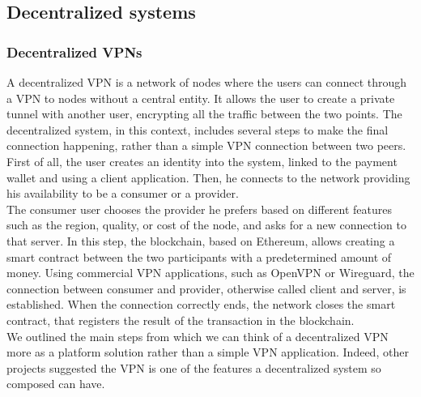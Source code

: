 \documentclass[12pt]{article}
\begin{document}
	\subsection{Decentralized systems}

	\subsubsection{Decentralized VPNs}

	A decentralized VPN is a network of nodes where the users can connect through a VPN to nodes without a central entity. It allows the user to create a private tunnel with another user, encrypting all the traffic between the two points. 
	The decentralized system, in this context, includes several steps to make the final connection happening, rather than a simple VPN connection between two peers.\\
	First of all, the user creates an identity into the system, linked to the payment wallet and using a client application. Then, he connects to the network providing his availability to be a consumer or a provider.\\
	The consumer user chooses the provider he prefers based on different features such as the region, quality, or cost of the node, and asks for a new connection to that server. In this step, the blockchain, based on Ethereum, allows creating a smart contract between the two participants with a predetermined amount of money. Using commercial VPN applications, such as OpenVPN or Wireguard, the connection between consumer and provider, otherwise called client and server, is established. When the connection correctly ends, the network closes the smart contract, that registers the result of the transaction in the blockchain.\\
	We outlined the main steps from which we can think of a decentralized VPN more as a platform solution rather than a simple VPN application. Indeed, other projects suggested the VPN is one of the features a decentralized system so composed can have.
		          
\end{document}
